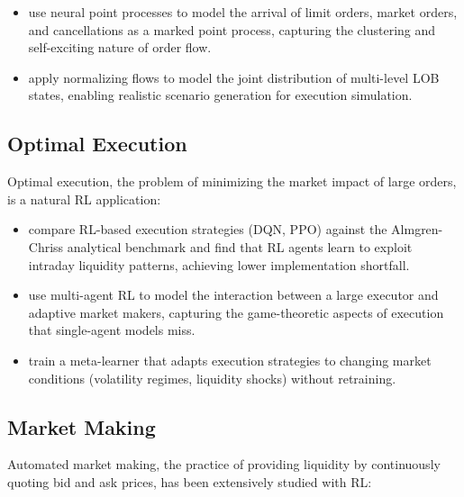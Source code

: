 \begin{itemize}[leftmargin=*]
    \item \citet{Cont2021} use neural point processes to model the arrival of limit orders, market orders, and cancellations as a marked point process, capturing the clustering and self-exciting nature of order flow.

    \item \citet{Shi2022} apply normalizing flows to model the joint distribution of multi-level LOB states, enabling realistic scenario generation for execution simulation.
\end{itemize}

\subsection{Optimal Execution}

Optimal execution, the problem of minimizing the market impact of large orders, is a natural RL application:

\begin{itemize}[leftmargin=*]
    \item \citet{Ning2021} compare RL-based execution strategies (DQN, PPO) against the Almgren-Chriss analytical benchmark \citep{Almgren2001} and find that RL agents learn to exploit intraday liquidity patterns, achieving lower implementation shortfall.

    \item \citet{Fang2021} use multi-agent RL to model the interaction between a large executor and adaptive market makers, capturing the game-theoretic aspects of execution that single-agent models miss.

    \item \citet{Schnaubelt2022} train a meta-learner that adapts execution strategies to changing market conditions (volatility regimes, liquidity shocks) without retraining.
\end{itemize}

\subsection{Market Making}

Automated market making, the practice of providing liquidity by continuously quoting bid and ask prices, has been extensively studied with RL:

